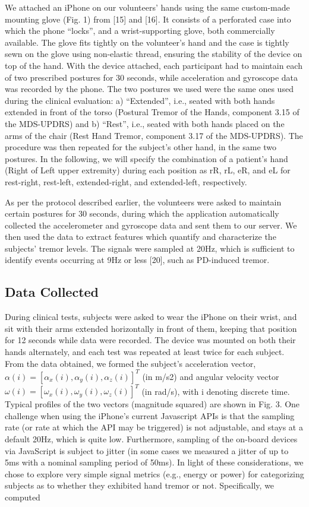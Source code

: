 We attached an iPhone on our volunteers’ hands using the same custom-made mounting glove (Fig. 1) from [15] and [16]. It consists of a perforated case into which the phone “locks”, and a wrist-supporting glove, both commercially available. The glove fits tightly on the volunteer’s hand and the case is tightly sewn on the glove using non-elastic thread, ensuring the stability of the device on top of the hand. With the device attached, each participant had to maintain each of two prescribed postures for 30 seconds, while acceleration and gyroscope data was recorded by the phone. The two postures we used were the same ones used during the clinical evaluation: a) “Extended”, i.e., seated with both hands extended in front of the torso (Postural Tremor of the Hands, component 3.15 of the MDS-UPDRS) and b) “Rest”, i.e., seated with both hands placed on the arms of the chair (Rest Hand Tremor, component 3.17 of the MDS-UPDRS). The procedure was then repeated for the subject’s other hand, in the same two postures. In the following, we will specify the combination of a patient’s hand (Right of Left upper extremity) during each position as rR, rL, eR, and eL for rest-right, rest-left, extended-right, and extended-left, respectively.

As per the protocol described earlier, the volunteers were asked to maintain certain postures for 30 seconds, during which the application automatically collected the accelerometer and gyroscope data and sent them to our server. We then used the data to extract features which quantify and characterize the subjects’ tremor levels. The signals were sampled at 20Hz, which is sufficient to identify events occurring at 9Hz or less [20], such as PD-induced tremor. 

\subsection{Data Collected}
\label{subsec:SmartCT1Data}
During clinical tests, subjects were asked to wear the iPhone on their wrist, and sit with their arms extended horizontally in front of them, keeping that position for 12 seconds while data were recorded. The device was mounted on both their hands alternately, and each test was repeated at least twice for each subject. From the data obtained, we formed the subject’s acceleration vector, $\alpha(i) = [\alpha_{x}(i),\alpha_{y}(i),\alpha_{z}(i)]^{T}$ (in m/s2) and angular velocity vector $\omega(i) = [\omega_{x}(i),\omega_{y}(i),\omega_{z}(i)]^{T}$ (in rad/s), with i denoting discrete time. Typical profiles of the two vectors (magnitude squared) are shown in Fig. 3.
One challenge when using the iPhone’s current Javascript APIs is that the sampling rate (or rate at which the API may be triggered) is not adjustable, and stays at a default 20Hz, which is quite low. Furthermore, sampling of the on-board devices via JavaScript is subject to jitter (in some cases we measured a jitter of up to 5ms with a nominal sampling period of 50ms). In light of these considerations, we chose to explore very simple signal metrics (e.g., energy or power) for categorizing subjects as to whether they exhibited hand tremor or not. Specifically, we computed


